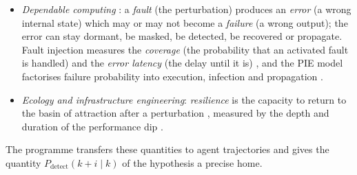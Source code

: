 \begin{itemize}[leftmargin=1.1em]
\item \emph{Dependable computing} \cite{avizienis2004dependability}: a \emph{fault} (the perturbation) produces an \emph{error} (a wrong internal state) which may or may not become a \emph{failure} (a wrong output); the error can stay dormant, be masked, be detected, be recovered or propagate. Fault injection measures the \emph{coverage} (the probability that an activated fault is handled) and the \emph{error latency} (the delay until it is) \cite{arlat1990fault,powell1995coverage}, and the PIE model factorises failure probability into execution, infection and propagation \cite{voas1992pie}.
\item \emph{Ecology and infrastructure engineering}: \emph{resilience} is the capacity to return to the basin of attraction after a perturbation \cite{holling1973resilience}, measured by the depth and duration of the performance dip \cite{bruneau2003resilience}.
\end{itemize}
The programme transfers these quantities to agent trajectories and gives the quantity $P_{\mathrm{detect}}(k{+}i\mid k)$ of the hypothesis a precise home.

